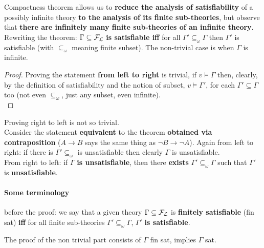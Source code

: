 \documentclass[11pt]{article}
\begin{document}
	Compactness theorem allows us to \textbf{reduce the analysis of satisfiability} of a possibly infinite theory \textbf{to the analysis of its finite sub-theories}, but observe that \textbf{there are infinitely many finite sub-theories of an infinite theory}.\\
	
	Rewriting the theorem: $\Gamma \subseteq \mathcal{F}_\mathcal{L}$ \textbf{is satisfiable iff} for all $\Gamma' \subseteq_{\omega} \Gamma$ then $\Gamma'$ is satisfiable (with $\subseteq_{\omega}$ meaning finite subset). The non-trivial case is when $\Gamma$ is infinite.\\
	
	\begin{proof}
		Proving the statement \textbf{from left to right} is trivial, if $v \models \Gamma$ then, clearly, by the definition of satisfiability and the notion of subset, $v \models \Gamma'$, for each $\Gamma' \subseteq \Gamma$ too (not even $\subseteq_\omega$, just any subset, even infinite).\\
	\end{proof}
	Proving right to left is not so trivial.\\
	
	Consider the statement \textbf{equivalent} to the theorem \textbf{obtained via contraposition} ($A \rightarrow B$ says the same thing as $\neg B \rightarrow \neg A$). Again from left to right: if there is $\Gamma' \subseteq_\omega$ is unsatisfiable then clearly $\Gamma$ is unsatisfiable.\\
	
	From right to left: if $\Gamma$ \textbf{is unsatisfiable}, then there \textbf{exists} $\Gamma' \subseteq_\omega \Gamma$ such that $\Gamma'$ is \textbf{unsatisfiable}.\\
	
	\newpage
	
	\paragraph{Some terminology} before the proof: we say that a given theory $\Gamma \subseteq \mathcal{F}_\mathcal{L}$ is \textbf{finitely satisfiable} (fin sat) \textbf{iff} for all finite sub-theories $\Gamma' \subseteq_\omega \Gamma$, $\Gamma'$ \textbf{is satisfiable}.
	
	The proof of the non trivial part consists of $\Gamma$ fin sat, implies $\Gamma$ sat.\\
	
\end{document}
